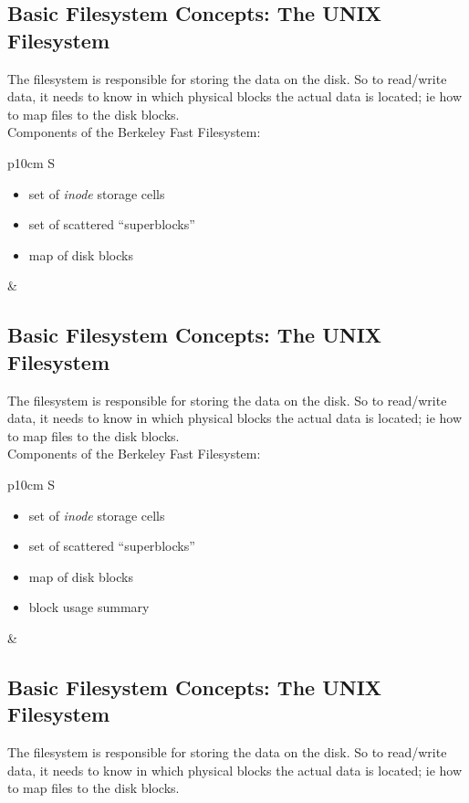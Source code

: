 \documentclass[xga]{xdvislides}
\begin{document}
\subsection{Basic Filesystem Concepts: The UNIX Filesystem}
The filesystem is responsible for storing the data on the disk.
So to read/write data, it needs to know in which physical blocks the actual
data is located; ie how to map files to the disk blocks.
\\

Components of the Berkeley Fast Filesystem:
\\

\begin{tabular}{ p{10cm} S }
\begin{itemize}
	\item set of {\em inode} storage cells
	\item set of scattered ``superblocks''
	\item map of disk blocks
\end{itemize}
&  \\
\end{tabular}

\subsection{Basic Filesystem Concepts: The UNIX Filesystem}
The filesystem is responsible for storing the data on the disk.
So to read/write data, it needs to know in which physical blocks the actual
data is located; ie how to map files to the disk blocks.
\\

Components of the Berkeley Fast Filesystem:
\\

\begin{tabular}{ p{10cm} S }
\begin{itemize}
	\item set of {\em inode} storage cells
	\item set of scattered ``superblocks''
	\item map of disk blocks
	\item block usage summary
\end{itemize}
&  \\
\end{tabular}

\subsection{Basic Filesystem Concepts: The UNIX Filesystem}
The filesystem is responsible for storing the data on the disk.
So to read/write data, it needs to know in which physical blocks the actual
data is located; ie how to map files to the disk blocks.
\\
\end{document}
